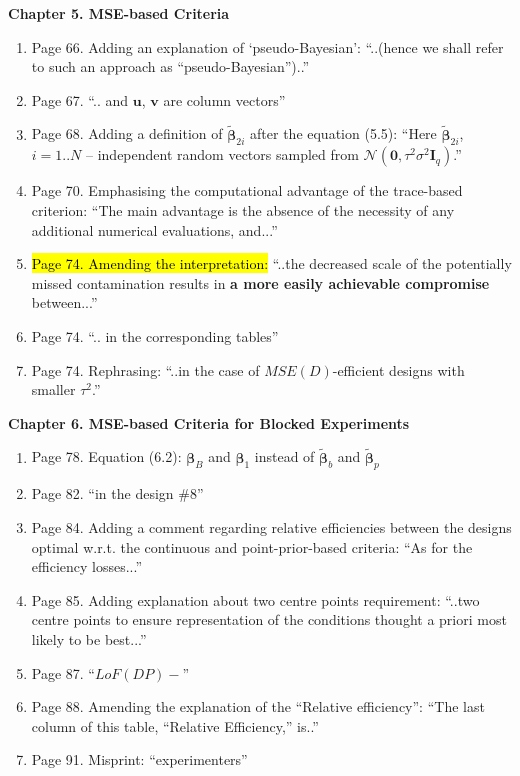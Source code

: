 \documentclass[11pt,a4paper,oneside]{article}
\begin{document}
\textbf{Chapter 5. MSE-based Criteria}
\begin{enumerate}
\item Page 66. Adding an explanation of `pseudo-Bayesian': ``..(hence we shall refer to such an approach as ``pseudo-Bayesian'')..''
\item Page 67. ``.. and $\bm{u}$, $\bm{v}$ are column vectors''
\item Page 68. Adding a definition of $\bm{\tilde{\beta}}_{2i}$ after the equation (5.5): ``Here $\bm{\tilde{\beta}}_{2i}$, $i=1..N$ -- independent random vectors sampled from $\mathcal{N}(\bm{0},\tau^{2}\sigma^{2}\bm{I}_{q})$.''
\item Page 70. Emphasising the computational advantage of the trace-based criterion: ``The main advantage is the absence of the necessity of any additional numerical evaluations, and...'' 
\item \hl{Page 74. Amending the interpretation:} ``..the decreased scale of the potentially missed contamination results in \textbf{a more easily achievable compromise} between...'' 
\item Page 74. ``.. in the corresponding tables'' 
\item Page 74. Rephrasing: ``..in the case of $MSE(D)$-efficient designs with smaller $\tau^2$.''
\end{enumerate}

\textbf{Chapter 6. MSE-based Criteria for Blocked Experiments}
\begin{enumerate}
\item Page 78. Equation (6.2): $\bm{\beta}_B$ and $\bm{\beta}_1$ instead of $\bm{\tilde{\beta}}_b$ and $\bm{\tilde{\beta}}_p$
\item Page 82. ``in the design \#$8$''
\item Page 84. Adding a comment regarding relative efficiencies between the designs optimal w.r.t. the continuous and point-prior-based criteria: ``As for the efficiency losses...''
\item Page 85. Adding explanation about two centre points requirement: ``..two centre points to ensure representation of the conditions thought a priori most likely to be best...'' 
\item Page 87. ``$LoF(DP)-$''
\item Page 88. Amending the explanation of the ``Relative efficiency'': ``The last column of this table, ``Relative Efficiency,'' is..''
\item Page 91. Misprint: ``experimenters''
\end{enumerate}
\end{document}
